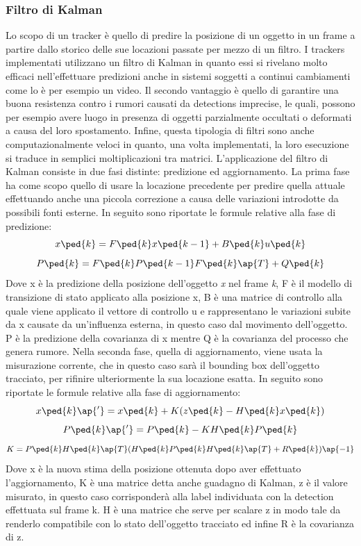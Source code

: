 \subsubsection{Filtro di Kalman}
Lo scopo di un tracker è quello di predire la posizione di un oggetto in un frame a partire dallo storico delle sue locazioni passate per mezzo di un filtro. I trackers implementati utilizzano un filtro di Kalman in quanto essi si rivelano molto efficaci nell'effettuare predizioni anche in sistemi soggetti a continui cambiamenti come lo è per esempio un video. Il secondo vantaggio è quello di garantire una buona resistenza contro i rumori causati da detections imprecise, le quali, possono per esempio avere luogo in presenza di oggetti parzialmente occultati o deformati a causa del loro spostamento. Infine, questa tipologia di filtri sono anche computazionalmente veloci in quanto, una volta implementati, la loro esecuzione si traduce in semplici moltiplicazioni tra matrici.
L'applicazione del filtro di Kalman consiste in due fasi distinte: predizione ed aggiornamento. La prima fase ha come scopo quello di usare la locazione precedente per predire quella attuale effettuando anche una piccola correzione a causa delle variazioni introdotte da possibili fonti esterne. In seguito sono riportate le formule relative alla fase di predizione:
\[
    x\ped{k} = F\ped{k}x\ped{k-1} + B\ped{k}u\ped{k}
\]
\[
    P\ped{k} = F\ped{k}P\ped{k-1}F\ped{k}\ap{T} + Q\ped{k}
\]
Dove x è la predizione della posizione dell'oggetto \textit{x} nel frame \textit{k}, F è il modello di transizione di stato applicato alla posizione x, B è una matrice di controllo alla quale viene applicato il vettore di controllo u e rappresentano le variazioni subite da x causate da un'influenza esterna, in questo caso dal movimento dell'oggetto. P è la predizione della covarianza di x mentre Q è la covarianza del processo che genera rumore.
Nella seconda fase, quella di aggiornamento, viene usata la misurazione corrente, che in questo caso sarà il bounding box dell'oggetto tracciato, per rifinire ulteriormente la sua locazione esatta. In seguito sono riportate le formule relative alla fase di aggiornamento:
\[
    x\ped{k}\ap{'} = x\ped{k} + K(z\ped{k}-H\ped{k}x\ped{k})
\]
\[
    P\ped{k}\ap{'} = P\ped{k} - KH\ped{k}P\ped{k}
\]
\[
	K = P\ped{k}H\ped{k}\ap{T}(H\ped{k}P\ped{k}H\ped{k}\ap{T} + R\ped{k})\ap{-1}
\]
Dove x è la nuova stima della posizione ottenuta dopo aver effettuato l'aggiornamento, K è una matrice detta anche guadagno di Kalman, z è il valore misurato, in questo caso corrisponderà alla label individuata con la detection effettuata sul frame k. H è una matrice che serve per scalare z in modo tale da renderlo compatibile con lo stato dell'oggetto tracciato ed infine R è la covarianza di z.
